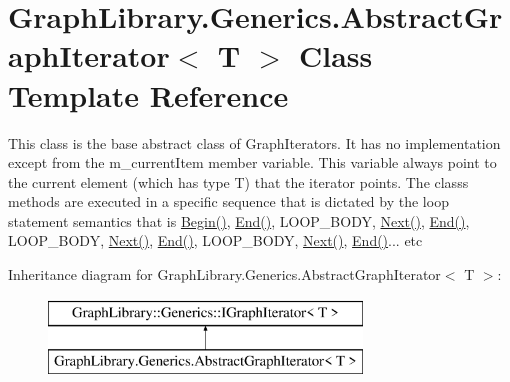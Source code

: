 \hypertarget{class_graph_library_1_1_generics_1_1_abstract_graph_iterator}{}\section{Graph\+Library.\+Generics.\+Abstract\+Graph\+Iterator$<$ T $>$ Class Template Reference}
\label{class_graph_library_1_1_generics_1_1_abstract_graph_iterator}


This class is the base abstract class of Graph\+Iterators. It has no implementation except from the m\+\_\+current\+Item member variable. This variable always point to the current element (which has type T) that the iterator points. The class\textquotesingle{}s methods are executed in a specific sequence that is dictated by the loop statement semantics that is \hyperlink{class_graph_library_1_1_generics_1_1_abstract_graph_iterator_a2c97c7a412c233b8442b7ad403f29779}{Begin()}, \hyperlink{class_graph_library_1_1_generics_1_1_abstract_graph_iterator_aa8cd9f596ec0b6c4c1e9c244ba75df04}{End()}, L\+O\+O\+P\+\_\+\+B\+O\+D\+Y, \hyperlink{class_graph_library_1_1_generics_1_1_abstract_graph_iterator_aac8cffd0d579708a94ba056e4f4a00b2}{Next()}, \hyperlink{class_graph_library_1_1_generics_1_1_abstract_graph_iterator_aa8cd9f596ec0b6c4c1e9c244ba75df04}{End()}, L\+O\+O\+P\+\_\+\+B\+O\+D\+Y, \hyperlink{class_graph_library_1_1_generics_1_1_abstract_graph_iterator_aac8cffd0d579708a94ba056e4f4a00b2}{Next()}, \hyperlink{class_graph_library_1_1_generics_1_1_abstract_graph_iterator_aa8cd9f596ec0b6c4c1e9c244ba75df04}{End()}, L\+O\+O\+P\+\_\+\+B\+O\+D\+Y, \hyperlink{class_graph_library_1_1_generics_1_1_abstract_graph_iterator_aac8cffd0d579708a94ba056e4f4a00b2}{Next()}, \hyperlink{class_graph_library_1_1_generics_1_1_abstract_graph_iterator_aa8cd9f596ec0b6c4c1e9c244ba75df04}{End()}... etc  


Inheritance diagram for Graph\+Library.\+Generics.\+Abstract\+Graph\+Iterator$<$ T $>$\+:\begin{figure}[H]
\begin{center}
\leavevmode
\includegraphics[height=2.000000cm]{class_graph_library_1_1_generics_1_1_abstract_graph_iterator}
\end{center}
\end{figure}
